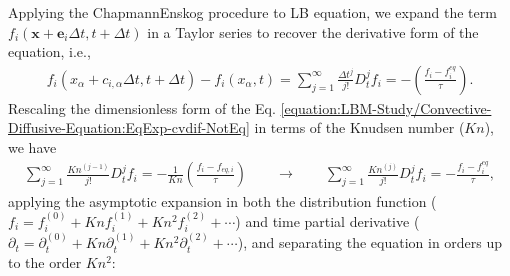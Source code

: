 \documentclass[letterpaper,10pt,english,openany,oneside]{jupyterBook}
\begin{document}
\sphinxAtStartPar
Applying the Chapmann\sphinxhyphen{}Enskog procedure to LB equation, we expand the term \(f_{i}\left(\boldsymbol{x}+\boldsymbol{e}_i \Delta t, t+\Delta t\right)\) in a Taylor series to recover the derivative form of the equation, i.e.,
\begin{equation}\label{equation:LBM-Study/Convective-Diffusive-Equation:EqExp-cvdif-NotEq}
\begin{split}
f_{i}\left( x_{\alpha} + c_{i,\alpha} \Delta t, t+\Delta t\right)- f_{i}(x_{\alpha}, t)=\displaystyle\sum_{j=1}^{\infty}\frac{\Delta t^{j}}{j!}D_{t}^{j}f_{i}= -\left( \frac{ f_{i} - f_{i}^{eq} }{ \tau } \right) .
\end{split}
\end{equation}
\sphinxAtStartPar
Rescaling the dimensionless form of the Eq. \eqref{equation:LBM-Study/Convective-Diffusive-Equation:EqExp-cvdif-NotEq} in terms of the Knudsen number (\(Kn\)), we have
\begin{equation*}
\begin{split}
\displaystyle \sum^{\infty}_{j=1}  \frac{Kn^{(j-1)}}{j!} D_{t}^{j} f_{i} = - \frac{1}{Kn}\left( \frac{ f_{i} - f_{eq,i} }{ \tau } \right) \quad \quad \rightarrow \quad \quad \displaystyle \sum^{\infty}_{j=1}  \frac{Kn^{(j)}}{j!} D_{t}^{j} f_{i} = -  \frac{ f_{i} - f_{i}^{eq} }{ \tau },
\end{split}
\end{equation*}
\sphinxAtStartPar
applying the asymptotic expansion in both the distribution function (\(f_{i}=f_{i}^{(0)}+Kn f_{i}^{(1)} + Kn^{2} f_{i}^{(2)}+\cdots\)) and time partial derivative (\(\partial_{t}=\partial_{t}^{(0)}+ Kn \partial_{t}^{(1)}+Kn^{2} \partial_{t}^{(2)}+\cdots\)), and separating the equation in orders up to the order \(Kn^{2}\):
\end{document}

